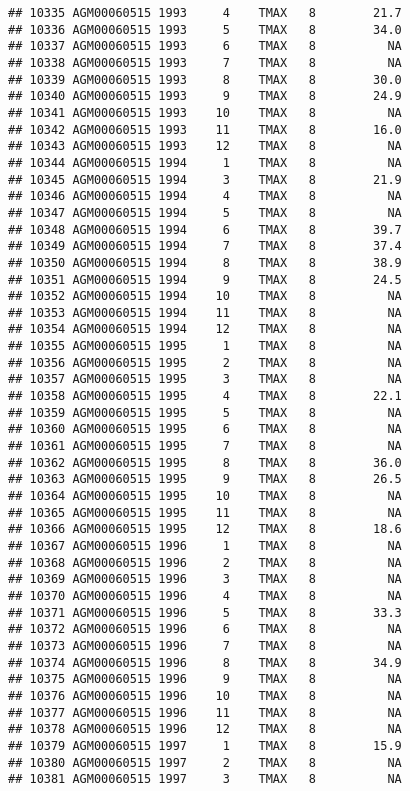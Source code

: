 \documentclass{article}\usepackage[]{graphicx}\usepackage[]{color}
\makeatletter
\newenvironment{kframe}{%
 \def\at@end@of@kframe{}%
 \ifinner\ifhmode%
  \def\at@end@of@kframe{\end{minipage}}%
  \begin{minipage}{\columnwidth}%
 \fi\fi%
 \def\FrameCommand##1{\hskip\@totalleftmargin \hskip-\fboxsep
 \colorbox{shadecolor}{##1}\hskip-\fboxsep
     \hskip-\linewidth \hskip-\@totalleftmargin \hskip\columnwidth}%
 \MakeFramed {\advance\hsize-\width
   \@totalleftmargin\z@ \linewidth\hsize
   \@setminipage}}%
 {\par\unskip\endMakeFramed%
 \at@end@of@kframe}
\newenvironment{knitrout}{}{} %
\makeatother
\begin{document}
\begin{knitrout}
\begin{kframe}
\begin{verbatim}
## 10335 AGM00060515 1993     4    TMAX   8        21.7
## 10336 AGM00060515 1993     5    TMAX   8        34.0
## 10337 AGM00060515 1993     6    TMAX   8          NA
## 10338 AGM00060515 1993     7    TMAX   8          NA
## 10339 AGM00060515 1993     8    TMAX   8        30.0
## 10340 AGM00060515 1993     9    TMAX   8        24.9
## 10341 AGM00060515 1993    10    TMAX   8          NA
## 10342 AGM00060515 1993    11    TMAX   8        16.0
## 10343 AGM00060515 1993    12    TMAX   8          NA
## 10344 AGM00060515 1994     1    TMAX   8          NA
## 10345 AGM00060515 1994     3    TMAX   8        21.9
## 10346 AGM00060515 1994     4    TMAX   8          NA
## 10347 AGM00060515 1994     5    TMAX   8          NA
## 10348 AGM00060515 1994     6    TMAX   8        39.7
## 10349 AGM00060515 1994     7    TMAX   8        37.4
## 10350 AGM00060515 1994     8    TMAX   8        38.9
## 10351 AGM00060515 1994     9    TMAX   8        24.5
## 10352 AGM00060515 1994    10    TMAX   8          NA
## 10353 AGM00060515 1994    11    TMAX   8          NA
## 10354 AGM00060515 1994    12    TMAX   8          NA
## 10355 AGM00060515 1995     1    TMAX   8          NA
## 10356 AGM00060515 1995     2    TMAX   8          NA
## 10357 AGM00060515 1995     3    TMAX   8          NA
## 10358 AGM00060515 1995     4    TMAX   8        22.1
## 10359 AGM00060515 1995     5    TMAX   8          NA
## 10360 AGM00060515 1995     6    TMAX   8          NA
## 10361 AGM00060515 1995     7    TMAX   8          NA
## 10362 AGM00060515 1995     8    TMAX   8        36.0
## 10363 AGM00060515 1995     9    TMAX   8        26.5
## 10364 AGM00060515 1995    10    TMAX   8          NA
## 10365 AGM00060515 1995    11    TMAX   8          NA
## 10366 AGM00060515 1995    12    TMAX   8        18.6
## 10367 AGM00060515 1996     1    TMAX   8          NA
## 10368 AGM00060515 1996     2    TMAX   8          NA
## 10369 AGM00060515 1996     3    TMAX   8          NA
## 10370 AGM00060515 1996     4    TMAX   8          NA
## 10371 AGM00060515 1996     5    TMAX   8        33.3
## 10372 AGM00060515 1996     6    TMAX   8          NA
## 10373 AGM00060515 1996     7    TMAX   8          NA
## 10374 AGM00060515 1996     8    TMAX   8        34.9
## 10375 AGM00060515 1996     9    TMAX   8          NA
## 10376 AGM00060515 1996    10    TMAX   8          NA
## 10377 AGM00060515 1996    11    TMAX   8          NA
## 10378 AGM00060515 1996    12    TMAX   8          NA
## 10379 AGM00060515 1997     1    TMAX   8        15.9
## 10380 AGM00060515 1997     2    TMAX   8          NA
## 10381 AGM00060515 1997     3    TMAX   8          NA

\end{verbatim}
\end{kframe}
\end{knitrout}
\end{document}
